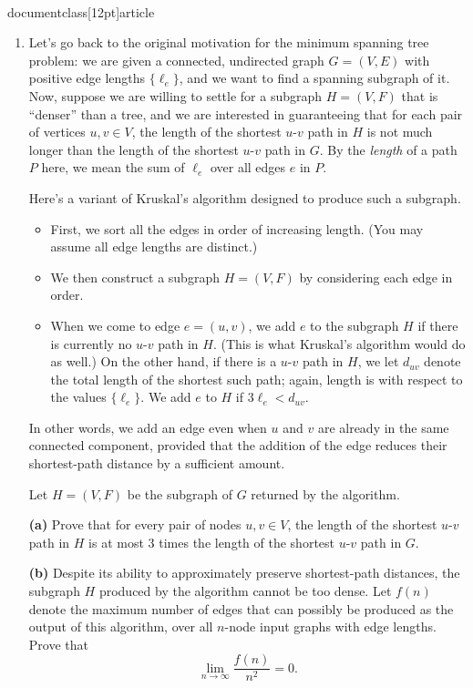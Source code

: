 \\documentclass[12pt]{article}
\begin{document}
\begin{enumerate}
{}


\item 

Let's go back to the original motivation for the minimum spanning
tree problem: we are given a connected, undirected graph
$G = (V,E)$ with positive edge lengths $\{\ell_e\}$, and we want
to find a spanning subgraph of it.
Now, suppose we are willing to settle for a subgraph $H = (V,F)$
that is ``denser'' than a tree, and we are interested
in guaranteeing that for each pair of vertices $u, v \in V$,
the length of the shortest $u$-$v$ path in $H$
is not much longer than the length of the shortest
$u$-$v$ path in $G$.
By the {\em length} of a path $P$ here,
we mean the sum of $\ell_e$ over all edges $e$ in $P$.

Here's a variant of Kruskal's algorithm designed to produce such a subgraph.
\begin{itemize}
\item First, we sort all the edges in order of increasing length.
(You may assume all edge lengths are distinct.)
\item We then construct a subgraph $H = (V,F)$ by
considering each edge in order.
\item When we come to edge $e = (u,v)$,
we add $e$ to the subgraph $H$ if there is currently
no $u$-$v$ path in $H$.
(This is what Kruskal's algorithm would do as well.)
On the other hand, if there is a $u$-$v$ path in $H$,
we let $d_{uv}$ denote the total length of the shortest such path;
again, length is with respect to the values $\{\ell_e\}$.
We add $e$ to $H$ if $3 \ell_e < d_{uv}$.
\end{itemize}
In other words, we add an edge even when $u$ and $v$ are
already in the same connected component, provided that
the addition of the edge reduces their shortest-path distance
by a sufficient amount.

Let $H = (V,F)$ be the subgraph of $G$ returned by the algorithm.

\medskip
{\bf (a)} Prove that for every pair of nodes $u, v \in V$,
the length of the shortest $u$-$v$ path in $H$
is at most $3$ times the length of the
shortest $u$-$v$ path in $G$.

\medskip
{\bf (b)\Star} Despite its ability to approximately preserve
shortest-path distances, the subgraph $H$ produced
by the algorithm cannot be too dense.
Let $f(n)$ denote the maximum number of edges
that can possibly be produced as the output of this algorithm,
over all $n$-node input graphs with edge lengths.
Prove that $$\lim_{n \rightarrow \infty} \frac{f(n)}{n^2} = 0.$$


\end{enumerate}
\end{document}

